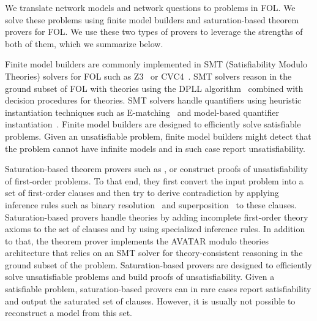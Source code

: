 
We translate network models and network questions to problems in FOL. We solve these problems using finite model builders and saturation-based theorem provers for FOL. We use these two types of provers to leverage the strengths of both of them, which we summarize below.

Finite model builders are commonly implemented in SMT (Satisfiability Modulo Theories) solvers for FOL such as Z3~\cite{Z3} or CVC4~\cite{CVC4}. SMT solvers reason in the ground subset of FOL with theories using the DPLL algorithm~\cite{davis1960computing} combined with decision procedures for theories. SMT solvers handle quantifiers using heuristic instantiation techniques such as E-matching~\cite{DBLP:journals/jacm/DetlefsNS05,DBLP:conf/cade/MouraB07} and model-based quantifier instantiation~\cite{DBLP:journals/jacm/DetlefsNS05,DBLP:conf/cade/MouraB07}. Finite model builders are designed to efficiently solve satisfiable problems. Given an unsatisfiable problem, finite model builders might detect that the problem cannot have infinite models and in such case report unsatisfiability.

Saturation-based theorem provers such as \eprover\cite{E13}, \spass\cite{Spass} or \vampire\cite{Vampire13} construct proofs of unsatisfiability of first-order problems. To that end, they first convert the input problem into a set of first-order clauses and then try to derive contradiction by applying inference rules such as binary resolution~\cite{Ganzinger01} and superposition~\cite{NieuwenhuisRubio:HandbookAR:paramodulation:2001} to these clauses.  Saturation-based provers handle theories by adding incomplete first-order theory axioms to the set of clauses and by using specialized inference rules. In addition to that, the \vampire theorem prover implements the AVATAR modulo theories~\cite{DBLP:conf/gcai/RegerB0V16} architecture that relies on an SMT solver for theory-consistent reasoning in the ground subset of the problem. Saturation-based provers are designed to efficiently solve unsatisfiable problems and build proofs of unsatisfiability. Given a satisfiable problem, saturation-based provers can in rare cases report satisfiability and output the saturated set of clauses. However, it is usually not possible to reconstruct a model from this set.

